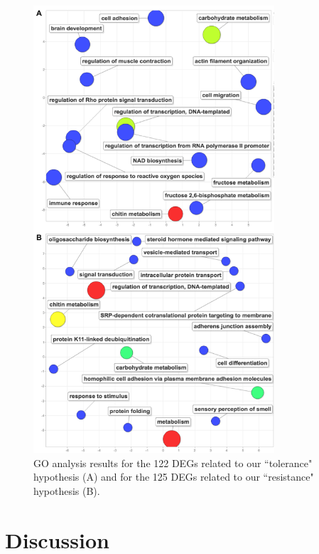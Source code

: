 \documentclass[11pt,a4paper,oldfontcommands,openany]{memoir}
\numberwithin{equation}{section} %
\begin{document}
\begin{figure}[H]
  \centering
  \begin{framed}
  \includegraphics[width=0.8\textwidth]{Images/revigo}
  \end{framed}
  \caption{GO analysis results for the 122 DEGs related to our ``tolerance" hypothesis (A) and for the 125 DEGs related to our ``resistance" hypothesis (B).}
  \label{fig:revigo}
\end{figure}

\section{Discussion}
\end{document}

